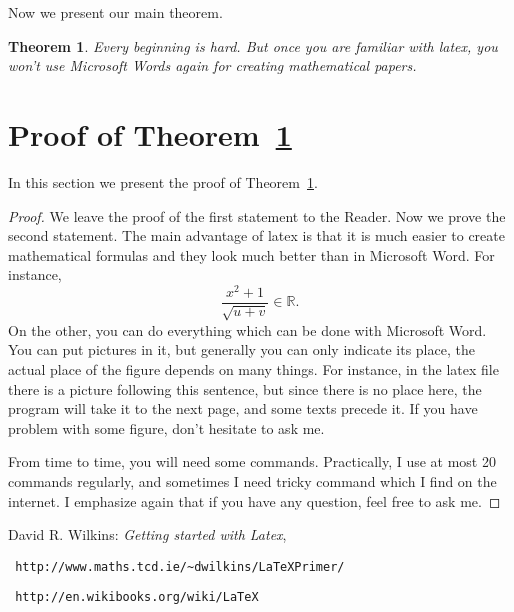 \documentclass[12pt,a4paper]{amsart}
\numberwithin{equation}{section}
\theoremstyle{plain}
\newtheorem{Th}{Theorem}[section]
\theoremstyle{definition}
\begin{document}
Now we present our main theorem.

\begin{Th} \label{main} Every beginning is hard. But once you are familiar with latex, you won't use Microsoft Words again for creating mathematical papers.
\end{Th}

\section{Proof of Theorem~\ref{main}}

In this section we present the proof of Theorem~\ref{main}.

\begin{proof} We leave the proof of the first statement to the Reader. Now we prove the second statement. The main advantage of latex is that it is much easier to create mathematical formulas and they look much better than in Microsoft Word.
For instance,
$$\frac{x^2+1}{\sqrt{u+v}}\in \mathbb{R}.$$
On the other, you can do everything which can be done with Microsoft Word. You can put pictures in it, but generally you can only indicate its place, the actual place of the figure depends on many things. For instance, in the latex file there is a picture following this sentence, but since there is no place here, the program will take it to the next page, and some texts precede it. If you have problem with some figure, don't hesitate to ask me.


From time to time, you will need some commands. Practically, I use at most 20 commands regularly, and sometimes I need tricky command which I find on the internet. I emphasize again that if you have any question, feel free to ask me.

\end{proof}

\begin{thebibliography}{99} 

 David R. Wilkins: \textit{Getting started with Latex}, \begin{verbatim} http://www.maths.tcd.ie/~dwilkins/LaTeXPrimer/
\end{verbatim}

 \begin{verbatim} http://en.wikibooks.org/wiki/LaTeX \end{verbatim}



\end{thebibliography}
\end{document}
